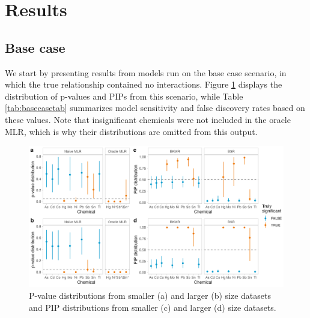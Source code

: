 \documentclass[12pt, twoside]{amherstthesis}
\begin{document}
\hypertarget{results}{%
\section{Results}\label{results}}

\hypertarget{base-case}{%
\subsection{Base case}\label{base-case}}

We start by presenting results from models run on the base case scenario, in which the true relationship contained no interactions. Figure \ref{fig:basecasesig} displays the distribution of p-values and PIPs from this scenario, while Table \ref{tab:basecasetab} summarizes model sensitivity and false discovery rates based on these values. Note that insignificant chemicals were not included in the oracle MLR, which is why their distributions are omitted from this output.
\begin{figure}

{\centering \includegraphics[width=1\linewidth]{figures/ch4_basecasesig} 

}

\caption{P-value distributions from smaller (a) and larger (b) size datasets and PIP distributions from smaller (c) and larger (d) size datasets.}\label{fig:basecasesig}
\end{figure}
\end{document}
